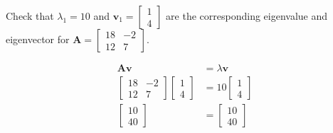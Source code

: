 Check that $\lambda_1 = 10$ and $\boldsymbol{v}_1 = \begin{bmatrix}1\\4\end{bmatrix}$ are the corresponding eigenvalue and eigenvector for $\boldsymbol{A} = \begin{bmatrix}18 & -2 \\ 12 & 7\end{bmatrix}$.

\begin{solution}
    \begin{align*}
        \boldsymbol{Av} &= \lambda\boldsymbol{v} \\
        \begin{bmatrix}
            18 & -2 \\
            12 & 7
        \end{bmatrix} \begin{bmatrix}
            1 \\ 4
        \end{bmatrix} &= 10\begin{bmatrix}
            1 \\ 4
        \end{bmatrix} \\
        \begin{bmatrix}
            10 \\ 40
        \end{bmatrix} &= \begin{bmatrix}
            10 \\ 40
        \end{bmatrix}
    \end{align*}
\end{solution}